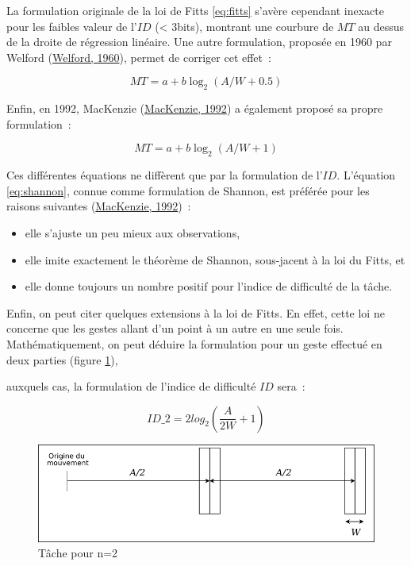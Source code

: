 \documentclass[
]{book}
\providecommand{\tightlist}{%
  \setlength{\itemsep}{0pt}\setlength{\parskip}{0pt}}
\begin{document}
La formulation originale de la loi de Fitts \eqref{eq:fitts} s'avère
cependant inexacte pour les faibles valeur de l'\(ID\) (\textless{} 3bits), montrant une courbure de \(MT\) au dessus de la droite de régression linéaire. Une autre
formulation, proposée en 1960 par Welford (\protect\hyperlink{ref-welford1960measurement}{Welford, 1960}), permet de corriger cet
effet~:

\begin{equation}
 MT=a+b\log_{2}(A/W+0.5)
\end{equation}

Enfin, en 1992, MacKenzie (\href{047-bibliographie.html\#MacKenzie92}{MacKenzie,
1992}) a également proposé sa propre formulation~:

\begin{equation}
 MT=a+b\log_{2}(A/W+1)
 \label{eq:shannon}
\end{equation}

Ces différentes équations ne diffèrent que par la formulation de
l'\(ID\). L'équation \eqref{eq:shannon}, connue
comme formulation de Shannon, est préférée pour les raisons suivantes
(\protect\hyperlink{ref-mackenzie1992fitts}{MacKenzie, 1992})~:

\begin{itemize}
\tightlist
\item
  elle s'ajuste un peu mieux aux observations,
\item
  elle imite exactement le théorème de Shannon,
  sous-jacent à la loi du Fitts, et
\item
  elle donne toujours un nombre positif pour l'indice
  de difficulté de la tâche.
\end{itemize}

Enfin, on peut citer quelques extensions à la loi de Fitts. En effet,
cette loi ne concerne que les gestes allant d'un point à un autre en une
seule fois. Mathématiquement, on peut déduire la formulation pour un geste
effectué en deux parties (figure \ref{fig:Tachepour2}),

auxquels cas, la formulation de l'indice de difficulté \(ID\) sera~:

\[ ID\_{2}=2log_{2}\left(\frac{A}{2W}+1\right)\]

\begin{figure}
\centering
\includegraphics{img/fitts2.png}
\caption{\label{fig:Tachepour2}Tâche pour n=2}
\end{figure}
\end{document}
